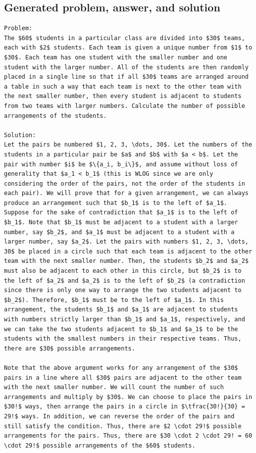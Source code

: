 \documentclass[11pt]{article}
\begin{document}
\subsection*{Generated problem, answer, and solution}
\begin{lstlisting}[style=modeloutput]
Problem:
The $60$ students in a particular class are divided into $30$ teams, each with $2$ students. Each team is given a unique number from $1$ to $30$. Each team has one student with the smaller number and one student with the larger number. All of the students are then randomly placed in a single line so that if all $30$ teams are arranged around a table in such a way that each team is next to the other team with the next smaller number, then every student is adjacent to students from two teams with larger numbers. Calculate the number of possible arrangements of the students.

Solution:
Let the pairs be numbered $1, 2, 3, \dots, 30$. Let the numbers of the students in a particular pair be $a$ and $b$ with $a < b$. Let the pair with number $i$ be $\{a_i, b_i\}$, and assume without loss of generality that $a_1 < b_1$ (this is WLOG since we are only considering the order of the pairs, not the order of the students in each pair). We will prove that for a given arrangement, we can always produce an arrangement such that $b_1$ is to the left of $a_1$. Suppose for the sake of contradiction that $a_1$ is to the left of $b_1$. Note that $b_1$ must be adjacent to a student with a larger number, say $b_2$, and $a_1$ must be adjacent to a student with a larger number, say $a_2$. Let the pairs with numbers $1, 2, 3, \dots, 30$ be placed in a circle such that each team is adjacent to the other team with the next smaller number. Then, the students $b_2$ and $a_2$ must also be adjacent to each other in this circle, but $b_2$ is to the left of $a_2$ and $a_2$ is to the left of $b_2$ (a contradiction since there is only one way to arrange the two students adjacent to $b_2$). Therefore, $b_1$ must be to the left of $a_1$. In this arrangement, the students $b_1$ and $a_1$ are adjacent to students with numbers strictly larger than $b_1$ and $a_1$, respectively, and we can take the two students adjacent to $b_1$ and $a_1$ to be the students with the smallest numbers in their respective teams. Thus, there are $30$ possible arrangements. 

Note that the above argument works for any arrangement of the $30$ pairs in a line where all $30$ pairs are adjacent to the other team with the next smaller number. We will count the number of such arrangements and multiply by $30$. We can choose to place the pairs in $30!$ ways, then arrange the pairs in a circle in $\tfrac{30!}{30} = 29!$ ways. In addition, we can reverse the order of the pairs and still satisfy the condition. Thus, there are $2 \cdot 29!$ possible arrangements for the pairs. Thus, there are $30 \cdot 2 \cdot 29! = 60 \cdot 29!$ possible arrangements of the $60$ students.


\end{lstlisting}
\end{document}
